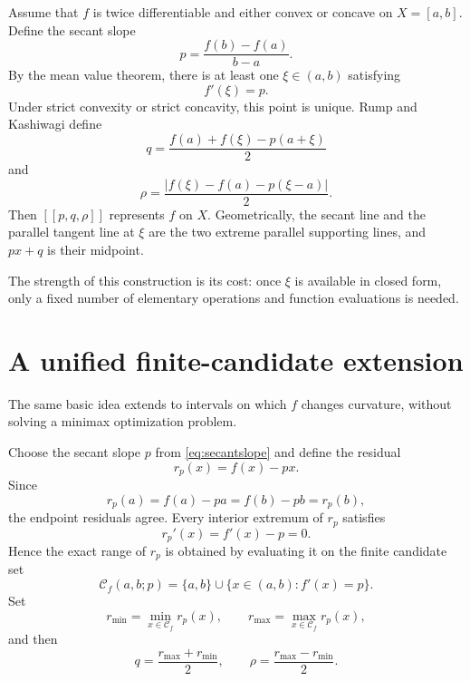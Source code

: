 \documentclass[11pt]{article}
\newcommand{\cand}{\mathcal{C}}
\begin{document}
Assume that \(f\) is twice differentiable and either convex or concave on \(X=[a,b]\). Define the secant slope
\begin{equation}\label{eq:secantslope}
  p=\frac{f(b)-f(a)}{b-a}.
\end{equation}
By the mean value theorem, there is at least one \(\xi\in(a,b)\) satisfying
\begin{equation}\label{eq:xi}
  f'(\xi)=p.
\end{equation}
Under strict convexity or strict concavity, this point is unique. Rump and Kashiwagi define
\begin{equation}\label{eq:rkq}
  q=\frac{f(a)+f(\xi)-p(a+\xi)}{2}
\end{equation}
and
\begin{equation}\label{eq:rkdelta}
  \rho=
  \frac{|f(\xi)-f(a)-p(\xi-a)|}{2}.
\end{equation}
Then \([[p,q,\rho]]\) represents \(f\) on \(X\). Geometrically, the secant line and the parallel tangent line at \(\xi\) are the two extreme parallel supporting lines, and \(px+q\) is their midpoint.

The strength of this construction is its cost: once \(\xi\) is available in closed form, only a fixed number of elementary operations and function evaluations is needed.

\section{A unified finite-candidate extension}

The same basic idea extends to intervals on which \(f\) changes curvature, without solving a minimax optimization problem.

Choose the secant slope \(p\) from \eqref{eq:secantslope} and define the residual
\begin{equation}\label{eq:residual}
  r_p(x)=f(x)-px.
\end{equation}
Since
\[
  r_p(a)=f(a)-pa=f(b)-pb=r_p(b),
\]
the endpoint residuals agree. Every interior extremum of \(r_p\) satisfies
\begin{equation}\label{eq:stationary}
  r_p'(x)=f'(x)-p=0.
\end{equation}
Hence the exact range of \(r_p\) is obtained by evaluating it on the finite candidate set
\begin{equation}\label{eq:candidates}
  \cand_f(a,b;p)
  =\{a,b\}\cup\{x\in(a,b):f'(x)=p\}.
\end{equation}
Set
\begin{equation}\label{eq:rminmax}
  r_{\min}=\min_{x\in\cand_f}r_p(x),
  \qquad
  r_{\max}=\max_{x\in\cand_f}r_p(x),
\end{equation}
and then
\begin{equation}\label{eq:qdelta-general}
  q=\frac{r_{\max}+r_{\min}}{2},
  \qquad
  \rho=\frac{r_{\max}-r_{\min}}{2}.
\end{equation}
\end{document}
